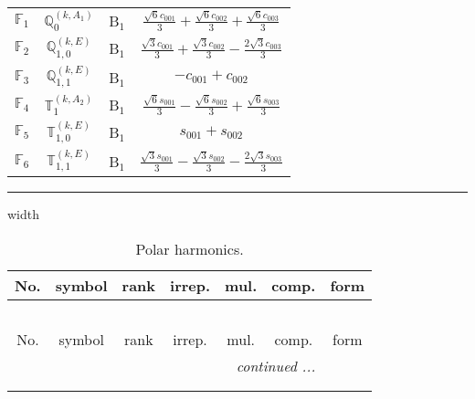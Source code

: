 \documentclass[fleqn,10pt,landscape]{article}
\begin{document}
\begin{itemize}
\begin{center}
\begin{longtable}{c|c|c|c}
$ \mathbb{F}_{1} $ & $\mathbb{Q}_{0}^{(k,A_{1})}$ & B$_{1}$ & $\frac{\sqrt{6} c_{001}}{3} + \frac{\sqrt{6} c_{002}}{3} + \frac{\sqrt{6} c_{003}}{3}$ \\
$ \mathbb{F}_{2} $ & $\mathbb{Q}_{1,0}^{(k,E)}$ & B$_{1}$ & $\frac{\sqrt{3} c_{001}}{3} + \frac{\sqrt{3} c_{002}}{3} - \frac{2 \sqrt{3} c_{003}}{3}$ \\
$ \mathbb{F}_{3} $ & $\mathbb{Q}_{1,1}^{(k,E)}$ & B$_{1}$ & $- c_{001} + c_{002}$ \\
$ \mathbb{F}_{4} $ & $\mathbb{T}_{1}^{(k,A_{2})}$ & B$_{1}$ & $\frac{\sqrt{6} s_{001}}{3} - \frac{\sqrt{6} s_{002}}{3} + \frac{\sqrt{6} s_{003}}{3}$ \\
$ \mathbb{F}_{5} $ & $\mathbb{T}_{1,0}^{(k,E)}$ & B$_{1}$ & $s_{001} + s_{002}$ \\
$ \mathbb{F}_{6} $ & $\mathbb{T}_{1,1}^{(k,E)}$ & B$_{1}$ & $\frac{\sqrt{3} s_{001}}{3} - \frac{\sqrt{3} s_{002}}{3} - \frac{2 \sqrt{3} s_{003}}{3}$ \\
\end{longtable}
\end{center}

 \hfil \hrule height 1mm width \textwidth \hfil

\begin{center}
\renewcommand{\arraystretch}{1.3}
\begin{longtable}{ccccccc}
\caption{Polar harmonics.}
 \\
 \hline \hline
No. & symbol & rank & irrep. & mul. & comp. & form \\ \hline \endfirsthead

\multicolumn{6}{l}{\tablename\ \thetable{}} \\
 \hline \hline
No. & symbol & rank & irrep. & mul. & comp. & form \\ \hline \endhead

 \hline \hline
\multicolumn{6}{r}{\footnotesize\it continued ...} \\ \endfoot

 \hline \hline
\multicolumn{6}{r}{} \\ \endlastfoot


\end{longtable}
\end{center}
\end{itemize}
\end{document}
